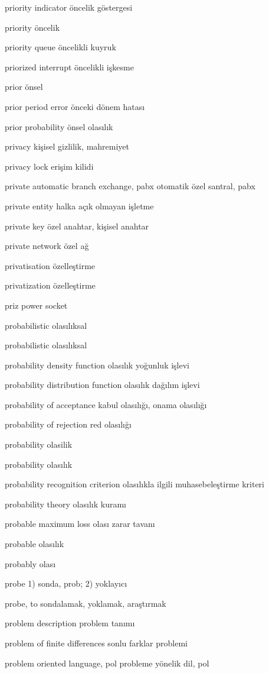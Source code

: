 \documentclass[12pt,fleqn]{article}\usepackage{../../common}
\begin{document}
priority indicator öncelik göstergesi

priority öncelik

priority queue öncelikli kuyruk

priorized interrupt öncelikli işkesme

prior önsel

prior period error önceki dönem hatası

prior probability önsel olasılık

privacy kişisel gizlilik, mahremiyet

privacy lock erişim kilidi

private automatic branch exchange, pabx otomatik özel santral, pabx

private entity halka açık olmayan işletme

private key özel anahtar, kişisel anahtar

private network özel ağ

privatisation özelleştirme

privatization özelleştirme

priz power socket

probabilistic olasılıksal

probabilistic olasılıksal

probability density function olasılık yoğunluk işlevi

probability distribution function olasılık dağılım işlevi

probability of acceptance kabul olasılığı, onama olasılığı

probability of rejection red olasılığı

probability olasilik

probability olasılık

probability recognition criterion olasılıkla ilgili muhasebeleştirme kriteri

probability theory olasılık kuramı

probable maximum loss olası zarar tavanı

probable olasılık

probably olası

probe 1) sonda, prob; 2) yoklayıcı

probe, to sondalamak, yoklamak, araştırmak

problem description problem tanımı

problem of finite differences sonlu farklar problemi

problem oriented language, pol probleme yönelik dil, pol
\end{document}
